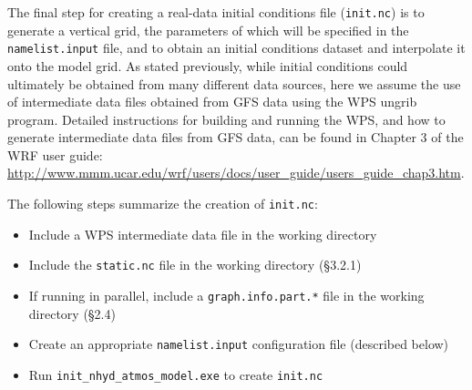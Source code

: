 The final step for creating a real-data initial conditions file ({\tt init.nc}) is to generate a vertical grid, the parameters of which will be specified in the {\tt namelist.input} file, and to obtain an initial conditions dataset and interpolate it onto the model grid. As stated previously, while initial conditions could ultimately be obtained from many different data sources, here we assume the use of intermediate data files obtained from GFS data using the WPS ungrib program.  Detailed instructions for building and running the WPS, and how to generate intermediate data files from GFS data, can be found in Chapter 3 of the WRF user guide: \\
\url{http://www.mmm.ucar.edu/wrf/users/docs/user\_guide/users\_guide\_chap3.htm}.

The following steps summarize the creation of {\tt init.nc}:

\begin{itemize}
\item Include a WPS intermediate data file in the working directory
\item Include the {\tt static.nc} file in the working directory (\S 3.2.1)
\item If running in parallel, include a {\tt graph.info.part.*} file in the working directory (\S 2.4)
\item Create an appropriate {\tt namelist.input} configuration file (described below)
\item Run {\tt init\_nhyd\_atmos\_model.exe} to create {\tt init.nc}
\end{itemize}


